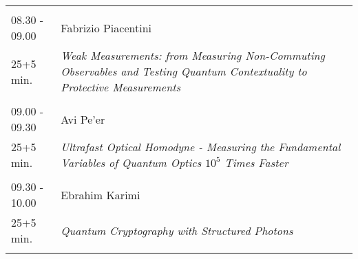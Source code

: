 \begin{longtable}{p{3cm}p{13cm}}
 & \\ 
08.30 - 09.00 & Fabrizio Piacentini\\ 
25+5 min. & {\it Weak Measurements: from Measuring Non-Commuting Observables and Testing Quantum Contextuality to Protective Measurements}\\ 
 & \\ 
09.00 - 09.30 & Avi Pe'er\\ 
25+5 min. & {\it Ultrafast Optical Homodyne - Measuring the Fundamental Variables of Quantum Optics $10^5$ Times Faster}\\ 
 & \\ 
09.30 - 10.00 & Ebrahim Karimi\\ 
25+5 min. & {\it Quantum Cryptography with Structured Photons}\\ 
 & \\ 
\end{longtable}

